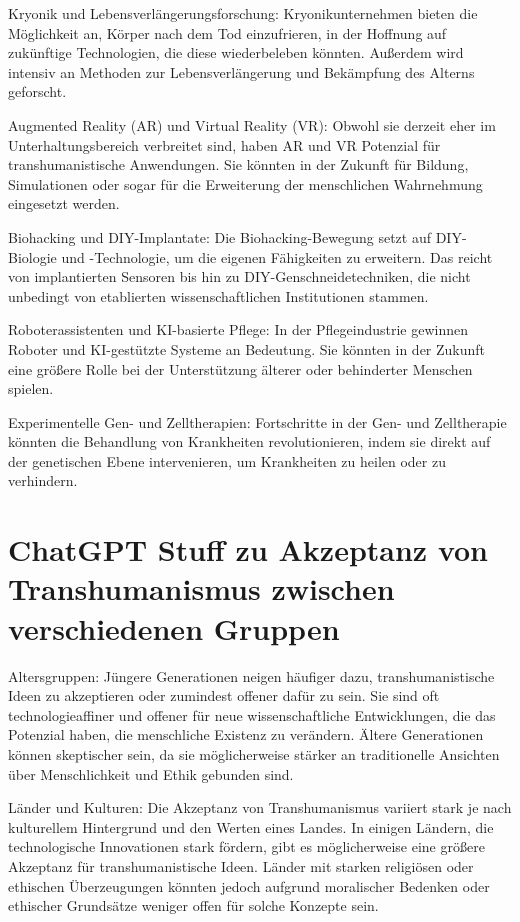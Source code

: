 \documentclass[a4paper,
DIV=13,
12pt,
BCOR=10mm,
department=FakEI,
twoside,
parskip=half,
automark,
]{OTHRartcl}
\begin{document}
Kryonik und Lebensverlängerungsforschung: Kryonikunternehmen bieten die Möglichkeit an, Körper nach dem Tod einzufrieren, in der Hoffnung auf zukünftige Technologien, die diese wiederbeleben könnten. Außerdem wird intensiv an Methoden zur Lebensverlängerung und Bekämpfung des Alterns geforscht.

Augmented Reality (AR) und Virtual Reality (VR): Obwohl sie derzeit eher im Unterhaltungsbereich verbreitet sind, haben AR und VR Potenzial für transhumanistische Anwendungen. Sie könnten in der Zukunft für Bildung, Simulationen oder sogar für die Erweiterung der menschlichen Wahrnehmung eingesetzt werden.

Biohacking und DIY-Implantate: Die Biohacking-Bewegung setzt auf DIY-Biologie und -Technologie, um die eigenen Fähigkeiten zu erweitern. Das reicht von implantierten Sensoren bis hin zu DIY-Genschneidetechniken, die nicht unbedingt von etablierten wissenschaftlichen Institutionen stammen.

Roboterassistenten und KI-basierte Pflege: In der Pflegeindustrie gewinnen Roboter und KI-gestützte Systeme an Bedeutung. Sie könnten in der Zukunft eine größere Rolle bei der Unterstützung älterer oder behinderter Menschen spielen.

Experimentelle Gen- und Zelltherapien: Fortschritte in der Gen- und Zelltherapie könnten die Behandlung von Krankheiten revolutionieren, indem sie direkt auf der genetischen Ebene intervenieren, um Krankheiten zu heilen oder zu verhindern.


\section*{ChatGPT Stuff zu Akzeptanz von Transhumanismus zwischen verschiedenen Gruppen}
Altersgruppen: Jüngere Generationen neigen häufiger dazu, transhumanistische Ideen zu akzeptieren oder zumindest offener dafür zu sein. Sie sind oft technologieaffiner und offener für neue wissenschaftliche Entwicklungen, die das Potenzial haben, die menschliche Existenz zu verändern. Ältere Generationen können skeptischer sein, da sie möglicherweise stärker an traditionelle Ansichten über Menschlichkeit und Ethik gebunden sind.

Länder und Kulturen: Die Akzeptanz von Transhumanismus variiert stark je nach kulturellem Hintergrund und den Werten eines Landes. In einigen Ländern, die technologische Innovationen stark fördern, gibt es möglicherweise eine größere Akzeptanz für transhumanistische Ideen. Länder mit starken religiösen oder ethischen Überzeugungen könnten jedoch aufgrund moralischer Bedenken oder ethischer Grundsätze weniger offen für solche Konzepte sein.
\end{document}
